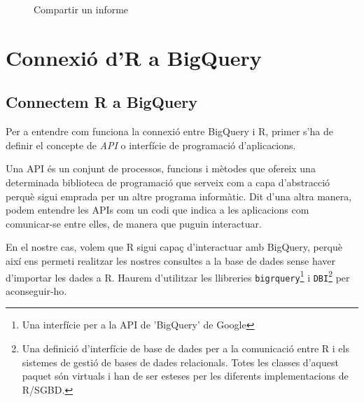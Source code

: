 \documentclass[12pt,longbibliography]{article}
\theoremstyle{definition}
\theoremstyle{remark}
\begin{document}
\begin{figure}[h!]
\par
{}%
\hfill
{}%
\par

\caption{Compartir un informe}
\label{fig:ds6}
\end{figure}

\newpage

\section{Connexió d'R a BigQuery}

\subsection{Connectem R a BigQuery}

Per a entendre com funciona la connexió entre BigQuery i R, primer s'ha de definir el concepte de \emph{API} o interfície de programació d'aplicacions.


Una API és un conjunt de processos, funcions i mètodes que ofereix una determinada biblioteca de programació que serveix com a capa d'abstracció perquè sigui emprada per un altre programa informàtic. Dit d'una altra manera, podem entendre les APIs com un codi que indica a les aplicacions com comunicar-se entre elles, de manera que puguin interactuar.


En el nostre cas, volem que R sigui capaç d'interactuar amb BigQuery, perquè així ens permeti realitzar les nostres consultes a la base de dades sense haver d'importar les dades a R. Haurem d'utilitzar les llibreries \texttt{bigrquery}\footnote{Una interfície per a la API de 'BigQuery' de Google} i \texttt{DBI}\footnote{Una definició d'interfície de base de dades per a la comunicació entre R i els sistemes de gestió de bases de dades relacionals. Totes les classes d'aquest paquet són virtuals i han de ser esteses per les diferents implementacions de R/SGBD.} per aconseguir-ho. 
\end{document}
